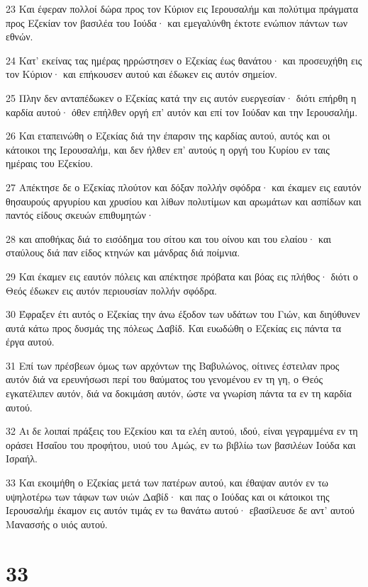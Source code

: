 \par 23 Και έφεραν πολλοί δώρα προς τον Κύριον εις Ιερουσαλήμ και πολύτιμα πράγματα προς Εζεκίαν τον βασιλέα του Ιούδα· και εμεγαλύνθη έκτοτε ενώπιον πάντων των εθνών.
\par 24 Κατ' εκείνας τας ημέρας ηρρώστησεν ο Εζεκίας έως θανάτου· και προσευχήθη εις τον Κύριον· και επήκουσεν αυτού και έδωκεν εις αυτόν σημείον.
\par 25 Πλην δεν ανταπέδωκεν ο Εζεκίας κατά την εις αυτόν ευεργεσίαν· διότι επήρθη η καρδία αυτού· όθεν επήλθεν οργή επ' αυτόν και επί τον Ιούδαν και την Ιερουσαλήμ.
\par 26 Και εταπεινώθη ο Εζεκίας διά την έπαρσιν της καρδίας αυτού, αυτός και οι κάτοικοι της Ιερουσαλήμ, και δεν ήλθεν επ' αυτούς η οργή του Κυρίου εν ταις ημέραις του Εζεκίου.
\par 27 Απέκτησε δε ο Εζεκίας πλούτον και δόξαν πολλήν σφόδρα· και έκαμεν εις εαυτόν θησαυρούς αργυρίου και χρυσίου και λίθων πολυτίμων και αρωμάτων και ασπίδων και παντός είδους σκευών επιθυμητών·
\par 28 και αποθήκας διά το εισόδημα του σίτου και του οίνου και του ελαίου· και σταύλους διά παν είδος κτηνών και μάνδρας διά ποίμνια.
\par 29 Και έκαμεν εις εαυτόν πόλεις και απέκτησε πρόβατα και βόας εις πλήθος· διότι ο Θεός έδωκεν εις αυτόν περιουσίαν πολλήν σφόδρα.
\par 30 Έφραξεν έτι αυτός ο Εζεκίας την άνω έξοδον των υδάτων του Γιών, και διηύθυνεν αυτά κάτω προς δυσμάς της πόλεως Δαβίδ. Και ευωδώθη ο Εζεκίας εις πάντα τα έργα αυτού.
\par 31 Επί των πρέσβεων όμως των αρχόντων της Βαβυλώνος, οίτινες έστειλαν προς αυτόν διά να ερευνήσωσι περί του θαύματος του γενομένου εν τη γη, ο Θεός εγκατέλιπεν αυτόν, διά να δοκιμάση αυτόν, ώστε να γνωρίση πάντα τα εν τη καρδία αυτού.
\par 32 Αι δε λοιπαί πράξεις του Εζεκίου και τα ελέη αυτού, ιδού, είναι γεγραμμένα εν τη οράσει Ησαΐου του προφήτου, υιού του Αμώς, εν τω βιβλίω των βασιλέων Ιούδα και Ισραήλ.
\par 33 Και εκοιμήθη ο Εζεκίας μετά των πατέρων αυτού, και έθαψαν αυτόν εν τω υψηλοτέρω των τάφων των υιών Δαβίδ· και πας ο Ιούδας και οι κάτοικοι της Ιερουσαλήμ έκαμον εις αυτόν τιμάς εν τω θανάτω αυτού· εβασίλευσε δε αντ' αυτού Μανασσής ο υιός αυτού.

\chapter{33}

